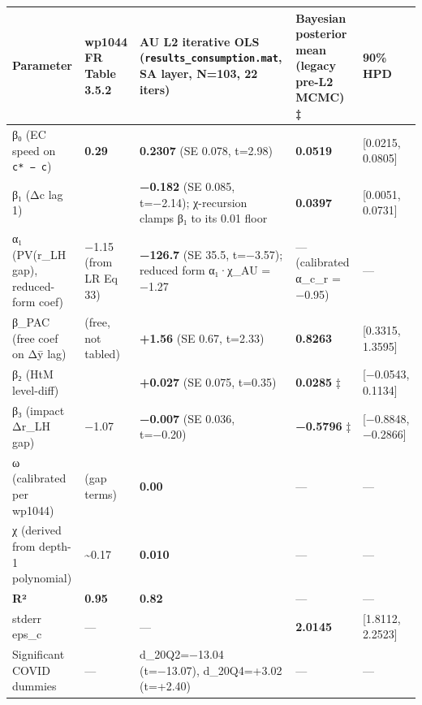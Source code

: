 \documentclass[
]{article}
\newcounter{none} %
\begin{document}
{\def\LTcaptype{none} %
\begin{longtable}[]{@{}
  >{\raggedright\arraybackslash}p{}
  >{\raggedright\arraybackslash}p{}
  >{\raggedright\arraybackslash}p{}
  >{\raggedright\arraybackslash}p{}
  >{\raggedright\arraybackslash}p{}@{}}
\toprule\noalign{}
\begin{minipage}[b]{\linewidth}\raggedright
Parameter
\end{minipage} & \begin{minipage}[b]{\linewidth}\raggedright
wp1044 FR Table 3.5.2
\end{minipage} & \begin{minipage}[b]{\linewidth}\raggedright
\textbf{AU L2 iterative OLS} (\texttt{results\_consumption.mat}, SA
layer, N=103, 22 iters)
\end{minipage} & \begin{minipage}[b]{\linewidth}\raggedright
Bayesian posterior mean (legacy pre-L2 MCMC) ‡
\end{minipage} & \begin{minipage}[b]{\linewidth}\raggedright
90\% HPD
\end{minipage} \\
\midrule\noalign{}
\endhead
\bottomrule\noalign{}
\endlastfoot
β₀ (EC speed on \texttt{c*\ −\ c}) & \textbf{0.29} & \textbf{0.2307} (SE
0.078, t=2.98) & \textbf{0.0519} & {[}0.0215, 0.0805{]} \\
β₁ (Δc lag 1) & 0.17 & \textbf{−0.182} (SE 0.085, t=−2.14); χ-recursion
clamps β₁ to its 0.01 floor & \textbf{0.0397} & {[}0.0051, 0.0731{]} \\
α₁ (PV(r\_LH gap), reduced-form coef) & −1.15 (from LR Eq 33) &
\textbf{−126.7} (SE 35.5, t=−3.57); reduced form α₁·χ\_AU = −1.27 & ---
(calibrated α\_c\_r = −0.95) & --- \\
β\_PAC (free coef on Δȳ lag) & (free, not tabled) & \textbf{+1.56} (SE
0.67, t=2.33) & \textbf{0.8263} & {[}0.3315, 1.3595{]} \\
β₂ (HtM level-diff) & 0.32 & \textbf{+0.027} (SE 0.075, t=0.35) &
\textbf{0.0285} ‡ & {[}−0.0543, 0.1134{]} \\
β₃ (impact Δr\_LH gap) & −1.07 & \textbf{−0.007} (SE 0.036, t=−0.20) &
\textbf{−0.5796} ‡ & {[}−0.8848, −0.2866{]} \\
ω (calibrated per wp1044) & 0.00 (gap terms) & \textbf{0.00} & --- &
--- \\
χ (derived from depth-1 polynomial) & \textasciitilde0.17 &
\textbf{0.010} & --- & --- \\
\textbf{R²} & \textbf{0.95} & \textbf{0.82} & --- & --- \\
stderr eps\_c & --- & --- & \textbf{2.0145} & {[}1.8112, 2.2523{]} \\
Significant COVID dummies & --- & d\_20Q2=−13.04 (t=−13.07),
d\_20Q4=+3.02 (t=+2.40) & --- & --- \\
\end{longtable}
}
\end{document}
